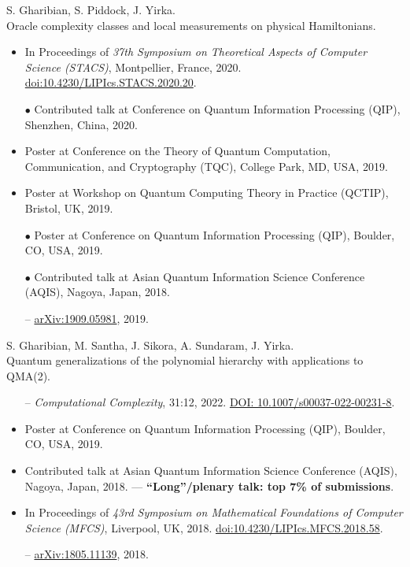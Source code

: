 \documentclass[11pt,letterpaper,serif]{moderncv}
\newcommand{\pubItemSep}{0em}
\begin{document}
S. Gharibian, S. Piddock, J. Yirka.
\\Oracle complexity classes and local measurements on physical Hamiltonians.
\begin{adjustwidth}{.1in}{}
	\begin{itemize}[itemsep=\pubItemSep]
		\item In Proceedings of \textit{37th Symposium on Theoretical Aspects of Computer Science (STACS)}, Montpellier, France, 2020. \href{https://doi.org/10.4230/LIPIcs.STACS.2020.20}{doi:10.4230/LIPIcs.STACS.2020.20}.
		\item[$\bullet$] Contributed talk at Conference on Quantum Information Processing (QIP), Shenzhen, China, 2020.
		\item Poster at Conference on the Theory of Quantum Computation, Communication, and Cryptography (TQC), College Park, MD, USA, 2019.
		\item Poster at Workshop on Quantum Computing Theory in Practice (QCTIP), Bristol, UK, 2019.
		\item[$\bullet$] Poster at Conference on Quantum Information Processing (QIP), Boulder, CO, USA, 2019.
		\item[$\bullet$] Contributed talk at Asian Quantum Information Science Conference (AQIS), Nagoya, Japan, 2018.
		\item[--]  \href{https://arxiv.org/abs/1909.05981}{arXiv:1909.05981}, 2019.
	\end{itemize}
\end{adjustwidth}
\vspace{\parsep}

S. Gharibian, M. Santha, J. Sikora, A. Sundaram, J. Yirka.
\\Quantum generalizations of the polynomial hierarchy with applications to QMA(2).
\begin{adjustwidth}{.1in}{}
	\begin{itemize}[itemsep=\pubItemSep]
		\item[--] \textit{Computational Complexity}, 31:12, 2022. \href{https://doi.org/10.1007/s00037-022-00231-8}{DOI: 10.1007/s00037-022-00231-8}.
		\item Poster at Conference on Quantum Information Processing (QIP), Boulder, CO, USA, 2019.
		\item Contributed talk at Asian Quantum Information Science Conference (AQIS), Nagoya, Japan, 2018. --- \textbf{``Long''/plenary talk: top 7\% of submissions}.
		\item In Proceedings of \textit{43rd Symposium on Mathematical Foundations of Computer Science (MFCS)}, Liverpool, UK, 2018. \href{https://doi.org/10.4230/LIPIcs.MFCS.2018.58}{doi:10.4230/LIPIcs.MFCS.2018.58}.
		\item[--] \href{https://arxiv.org/abs/1805.11139}{arXiv:1805.11139}, 2018.
	\end{itemize}
\end{adjustwidth}
\vspace{\parsep}
\end{document}

